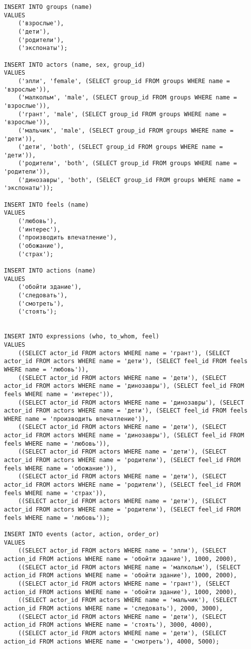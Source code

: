 
\begin{verbatim}
INSERT INTO groups (name)
VALUES
    ('взрослые'),
    ('дети'),
    ('родители'),
    ('экспонаты');

INSERT INTO actors (name, sex, group_id)
VALUES
    ('элли', 'female', (SELECT group_id FROM groups WHERE name = 'взрослые')),
    ('малкольм', 'male', (SELECT group_id FROM groups WHERE name = 'взрослые')),
    ('грант', 'male', (SELECT group_id FROM groups WHERE name = 'взрослые')),
    ('мальчик', 'male', (SELECT group_id FROM groups WHERE name = 'дети')),
    ('дети', 'both', (SELECT group_id FROM groups WHERE name = 'дети')),
    ('родители', 'both', (SELECT group_id FROM groups WHERE name = 'родители')),
    ('динозавры', 'both', (SELECT group_id FROM groups WHERE name = 'экспонаты'));

INSERT INTO feels (name)
VALUES
    ('любовь'),
    ('интерес'),
    ('производить впечатление'),
    ('обожание'),
    ('страх');

INSERT INTO actions (name)
VALUES
    ('обойти здание'),
    ('следовать'),
    ('смотреть'),
    ('стоять');


INSERT INTO expressions (who, to_whom, feel)
VALUES
    ((SELECT actor_id FROM actors WHERE name = 'грант'), (SELECT actor_id FROM actors WHERE name = 'дети'), (SELECT feel_id FROM feels WHERE name = 'любовь')),
    ((SELECT actor_id FROM actors WHERE name = 'дети'), (SELECT actor_id FROM actors WHERE name = 'динозавры'), (SELECT feel_id FROM feels WHERE name = 'интерес')),
    ((SELECT actor_id FROM actors WHERE name = 'динозавры'), (SELECT actor_id FROM actors WHERE name = 'дети'), (SELECT feel_id FROM feels WHERE name = 'производить впечатление')),
    ((SELECT actor_id FROM actors WHERE name = 'дети'), (SELECT actor_id FROM actors WHERE name = 'динозавры'), (SELECT feel_id FROM feels WHERE name = 'любовь')),
    ((SELECT actor_id FROM actors WHERE name = 'дети'), (SELECT actor_id FROM actors WHERE name = 'родители'), (SELECT feel_id FROM feels WHERE name = 'обожание')),
    ((SELECT actor_id FROM actors WHERE name = 'дети'), (SELECT actor_id FROM actors WHERE name = 'родители'), (SELECT feel_id FROM feels WHERE name = 'страх')),
    ((SELECT actor_id FROM actors WHERE name = 'дети'), (SELECT actor_id FROM actors WHERE name = 'родители'), (SELECT feel_id FROM feels WHERE name = 'любовь'));

INSERT INTO events (actor, action, order_or)
VALUES
    ((SELECT actor_id FROM actors WHERE name = 'элли'), (SELECT action_id FROM actions WHERE name = 'обойти здание'), 1000, 2000),
    ((SELECT actor_id FROM actors WHERE name = 'малкольм'), (SELECT action_id FROM actions WHERE name = 'обойти здание'), 1000, 2000),
    ((SELECT actor_id FROM actors WHERE name = 'грант'), (SELECT action_id FROM actions WHERE name = 'обойти здание'), 1000, 2000),
    ((SELECT actor_id FROM actors WHERE name = 'мальчик'), (SELECT action_id FROM actions WHERE name = 'следовать'), 2000, 3000),
    ((SELECT actor_id FROM actors WHERE name = 'дети'), (SELECT action_id FROM actions WHERE name = 'стоять'), 3000, 4000),
    ((SELECT actor_id FROM actors WHERE name = 'дети'), (SELECT action_id FROM actions WHERE name = 'смотреть'), 4000, 5000);
\end{verbatim}